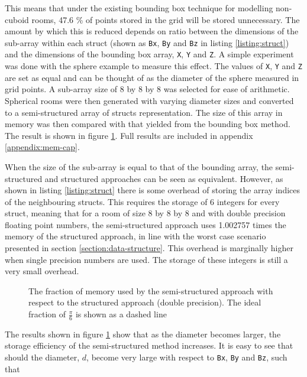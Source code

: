 \documentclass[12pt,a4paper]{report}
\begin{document}
This means that under the existing bounding box technique for modelling non-cuboid rooms, \num{47.6} \% of points stored in the grid will be stored unnecessary. The amount by which this is reduced depends on ratio between the dimensions of the sub-array within each struct (shown as \lstinline|Bx|, \lstinline|By| and \lstinline|Bz| in listing \ref{listing:struct}) and the dimensions of the bounding box array, \lstinline|X|, \lstinline|Y| and \lstinline|Z|. A simple experiment was done with the sphere example to measure this effect. The values of \lstinline|X|, \lstinline|Y| and \lstinline|Z| are set as equal and can be thought of as the diameter of the sphere measured in grid points. A sub-array size of \num{8} by \num{8} by \num{8} was selected for ease of arithmetic. Spherical rooms were then generated with varying diameter sizes and converted to a semi-structured array of structs representation. The size of this array in memory was then compared with that yielded from the bounding box method. The result is shown in figure \ref{figure:cap-sphere}. Full results are included in appendix \ref{appendix:mem-cap}.

When the size of the sub-array is equal to that of the bounding array, the semi-structured and structured approaches can be seen as equivalent. However, as shown in listing \ref{listing:struct}  there is some overhead of storing the array indices of the neighbouring structs. This requires the storage of 6 integers for every struct, meaning that for a room of size \num{8} by \num{8} by \num{8} and with double precision floating point numbers, the semi-structured approach uses \num{1.002757} times the memory of the structured approach, in line with the worst case scenario presented in section \ref{section:data-structure}. This overhead is marginally higher when single precision numbers are used. The storage of these integers is still a very small overhead.

\begin{figure}[H]
\centering%

\caption{The fraction of memory used by the semi-structured approach with respect to the structured approach (double precision). The ideal fraction of $\frac{\pi}{6}$ is shown as a dashed line}%
\label{figure:cap-sphere}%
\end{figure}%

The results shown in figure \ref{figure:cap-sphere} show that as the diameter becomes larger, the storage efficiency of the semi-structured method increases. It is easy to see that should the diameter, $d$, become very large with respect to \lstinline|Bx|, \lstinline|By| and \lstinline|Bz|, such that
\end{document}
